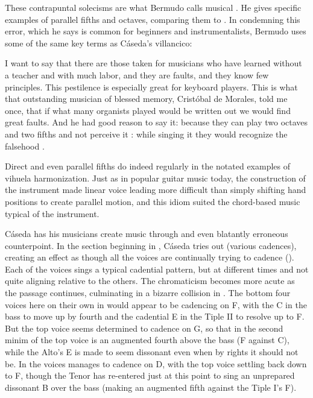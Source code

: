 
These contrapuntal solecisms are what Bermudo calls musical .
He gives specific examples of parallel fifths and octaves, comparing them to
.
In condemning this error, which he says is common for beginners and
instrumentalists, Bermudo uses some of the same key terms as Cáseda's
villancico:
\begin{quoting}
    I want to say that there are those taken for musicians who have learned
    without a teacher and with much labor, and they are faults, and they know
    few principles.
    This pestilence is especially great for keyboard players.  
    This is what that outstanding musician of blessed memory, Cristóbal de
    Morales, told me once, that if what many organists played would be written
    out we would find great faults.  
    And he had good reason to say it: because they can play two octaves and two
    fifths and not perceive it : while
    singing it they would recognize the falsehood .%
        \Autocite[]{Bermudo:Declaracion} 
\end{quoting}
Direct and even parallel fifths do indeed regularly in the notated examples of
vihuela harmonization.%
    \Autocite{Araujo-Mendonca:Vihuela}
Just as in popular guitar music today, the construction of the instrument made
linear voice leading more difficult than simply shifting hand positions to
create parallel motion, and this idiom suited the chord-based music typical of
the instrument.


Cáseda has his musicians create  music through 
and even blatantly erroneous counterpoint.
In the section beginning in , Cáseda tries out  (various cadences), creating an effect as though all the voices are  
continually trying to cadence ().
Each of the voices sings a typical cadential pattern, but at different times
and not quite aligning relative to the others.
The chromaticism becomes more acute as the passage continues, culminating in a
bizarre collision in .
The bottom four voices here on their own in  would appear to be
cadencing on F, with the C in the bass to move up by fourth and the cadential E
in the Tiple II to resolve up to F.
But the top voice seems determined to cadence on G, so that in the second minim
of  the top voice is an augmented fourth above the bass (F\sh{}
against C), while the Alto's E is made to seem dissonant even when by rights it
should not be.
In  the voices manages to cadence on D, with the top voice settling
back down to F\sh, though the Tenor has re-entered just at this point to sing
an unprepared dissonant B\fl{} over the bass (making an augmented fifth against
the Tiple I's F\sh).

